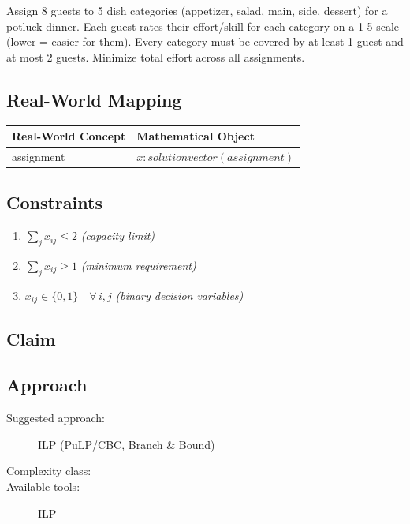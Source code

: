 \documentclass[11pt, a4paper]{article}
\begin{document}
Assign 8 guests to 5 dish categories (appetizer, salad, main, side, dessert) for a potluck dinner. Each guest rates their effort/skill for each category on a 1-5 scale (lower = easier for them). Every category must be covered by at least 1 guest and at most 2 guests. Minimize total effort across all assignments.

\subsection{Real-World Mapping}

\begin{longtable}{ll}
\toprule
\textbf{Real-World Concept} & \textbf{Mathematical Object} \\
\midrule
\endhead
assignment & $x: solution vector (assignment)$ \\
\bottomrule
\end{longtable}

\subsection{Constraints}

\begin{enumerate}
  \item $\sum_j x_{ij} \le 2$
  \hfill \textit{(capacity limit)}
  \item $\sum_j x_{ij} \ge 1$
  \hfill \textit{(minimum requirement)}
  \item $x_{ij} \in \{0, 1\} \quad \forall\, i, j$
  \hfill \textit{(binary decision variables)}
\end{enumerate}

\subsection{Claim}


\subsection{Approach}

\begin{description}
  \item[Suggested approach:] ILP (PuLP/CBC, Branch \& Bound)
  \item[Complexity class:] 
  \item[Available tools:] ILP
\end{description}
\end{document}
